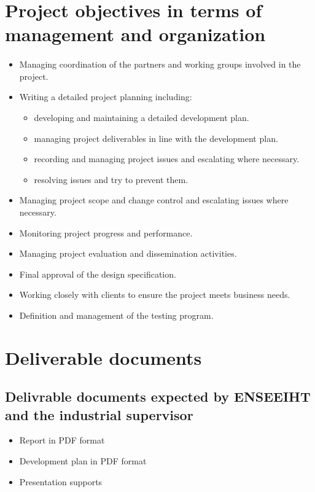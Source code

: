 \documentclass{report}
\begin{document}
\section{Project objectives in terms of management and organization}

\paragraph{}
\hspace{4mm}\begin{itemize} 
\item Managing coordination of the partners and working groups 
involved in the project.
\item Writing a detailed project planning including:
	\begin{itemize} 
	\item developing and maintaining a detailed development
	 plan.
	\item managing project deliverables in line with the 
	development plan.
	\item recording and managing project issues and escalating where
	 necessary.
	\item resolving issues and try to prevent them.
	\end{itemize}
\item Managing project scope and change control and escalating issues where necessary.
\item Monitoring project progress and performance.
\item Managing project evaluation and dissemination activities.
\item Final approval of the design specification.
\item Working closely with clients to ensure the project meets business needs.
\item Definition and management of the testing program.
\end{itemize}

\section{Deliverable documents}

\subsection{Delivrable documents expected by ENSEEIHT and the industrial supervisor}

\vspace{1.5mm}
\begin{itemize}
\item Report in PDF format\vspace{1mm}
\item Development plan in PDF format\vspace{1mm}
\item Presentation supports\vspace{1mm}
\end{itemize}
\end{document}
